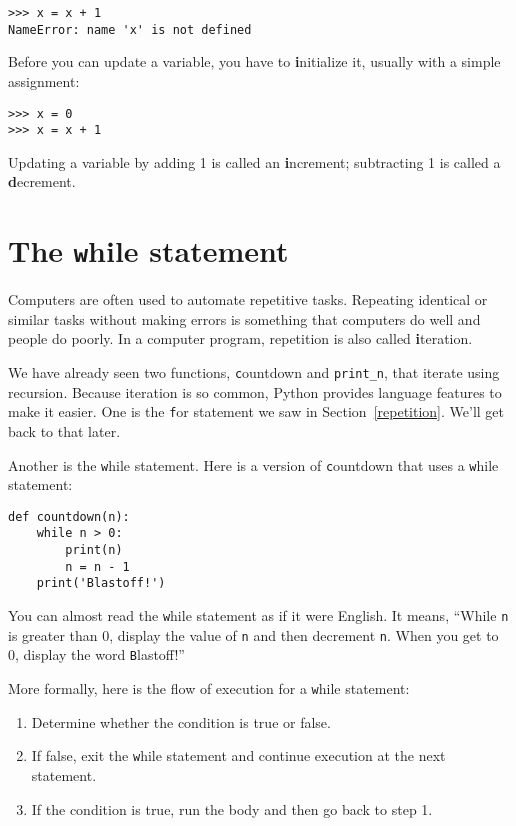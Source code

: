 \documentclass[
DIV=11,
fontsize=13,
twoside,
headinclude=false,
titlepage=firstiscover,
abstract=true,
headsepline=true,
footsepline=true,
chapterprefix=true, %
headings=big,
bibliography=totoc,%
captions=tableheading
]{scrbook}
\theoremstyle{definition}
\begin{document}
\begin{lstlisting}
>>> x = x + 1
NameError: name 'x' is not defined
\end{lstlisting}
%
Before you can update a variable, you have to {\textbf initialize}
it, usually with a simple assignment:

\begin{lstlisting}
>>> x = 0
>>> x = x + 1
\end{lstlisting}
%
Updating a variable by adding 1 is called an {\textbf increment};
subtracting 1 is called a {\textbf decrement}.




\section{The {\texttt while} statement}

Computers are often used to automate repetitive tasks.  Repeating
identical or similar tasks without making errors is something that
computers do well and people do poorly.  In a computer program,
repetition is also called {\textbf iteration}.

We have already seen two functions, {\texttt countdown} and
\verb"print_n", that iterate using recursion.  Because iteration is so
common, Python provides language features to make it easier.
One is the {\texttt for} statement we saw in Section~\ref{repetition}.
We'll get back to that later.

Another is the {\texttt while} statement.  Here is a version of {\texttt
countdown} that uses a {\texttt while} statement:

\begin{lstlisting}
def countdown(n):
    while n > 0:
        print(n)
        n = n - 1
    print('Blastoff!')
\end{lstlisting}
%
You can almost read the {\texttt while} statement as if it were English.
It means, ``While {\texttt n} is greater than 0,
display the value of {\texttt n} and then decrement
{\texttt n}.  When you get to 0, display the word {\texttt Blastoff!}''

More formally, here is the flow of execution for a {\texttt while} statement:

\begin{enumerate}

\item Determine whether the condition is true or false.

\item If false, exit the {\texttt while} statement
and continue execution at the next statement.

\item If the condition is true, run the
body and then go back to step 1.

\end{enumerate}
\end{document}
